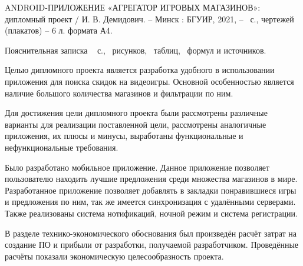 \thispagestyle{empty}

ANDROID-ПРИЛОЖЕНИЕ «АГРЕГАТОР ИГРОВЫХ МАГАЗИНОВ»: дипломный проект / И. В. Демидович. – Минск : БГУИР, 2021, –~\pageref*{LastPage} с., чертежей (плакатов) – 6 л. формата А4.

Пояснительная записка ~\pageref*{LastPage} с., \totfig{}~рисунков, \tottab{}~таблиц, \toteq{}~формул и \totref{} источников.

Целью дипломного проекта является разработка удобного в использовании приложения для поиска скидок на видеоигры.
Основной особенностью является наличие большого количества магазинов и фильтрации по ним.

Для достижения цели дипломного проекта были рассмотрены различные варианты для реализации поставленной цели, рассмотрены аналогичные приложения, их плюсы и минусы, выработаны функциональные и нефункциональные требования.

Было разработано мобильное приложение. 
Данное приложение позволяет пользователю находить лучшие предложения среди множества магазинов в мире.
Разработанное приложение позволяет добавлять в закладки понравившиеся игры и предложения по ним, так же имеется синхронизация с удалёнными серверами.
Также реализованы система нотификаций, ночной режим и система регистрации.

В разделе технико-экономического обоснования был произведён расчёт затрат на создание ПО и прибыли от разработки, получаемой разработчиком. Проведённые расчёты показали экономическую целесообразность проекта.
\clearpage
